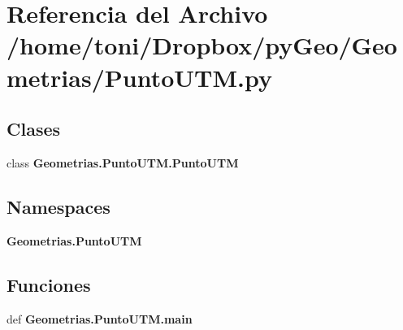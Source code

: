 \section{Referencia del Archivo /home/toni/\-Dropbox/py\-Geo/\-Geometrias/\-Punto\-U\-T\-M.py}
\label{PuntoUTM_8py}
\subsection*{Clases}
\begin{DoxyCompactItemize}
\item 
class {\bf Geometrias.\-Punto\-U\-T\-M.\-Punto\-U\-T\-M}
\end{DoxyCompactItemize}
\subsection*{Namespaces}
\begin{DoxyCompactItemize}
\item 
{\bf Geometrias.\-Punto\-U\-T\-M}
\end{DoxyCompactItemize}
\subsection*{Funciones}
\begin{DoxyCompactItemize}
\item 
def {\bf Geometrias.\-Punto\-U\-T\-M.\-main}
\end{DoxyCompactItemize}
